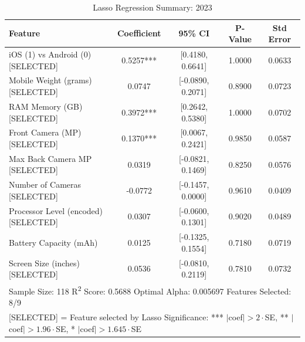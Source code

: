 \documentclass[12pt]{article}
\begin{document}
\begin{table}[ht]
\centering
\caption{Lasso Regression Summary: 2023}
\begin{tabular}{lcccc}
\toprule
Feature & Coefficient & 95\% CI & P-Value & Std Error \\
\midrule
iOS (1) vs Android (0) [SELECTED] & 0.5257*** & {[0.4180, 0.6641]} & 1.0000 & 0.0633 \\
Mobile Weight (grams) [SELECTED] & 0.0747 & {[-0.0890, 0.2071]} & 0.8900 & 0.0723 \\
RAM Memory (GB) [SELECTED] & 0.3972*** & {[0.2642, 0.5380]} & 1.0000 & 0.0702 \\
Front Camera (MP) [SELECTED] & 0.1370*** & {[0.0067, 0.2421]} & 0.9850 & 0.0587 \\
Max Back Camera MP [SELECTED] & 0.0319 & {[-0.0821, 0.1469]} & 0.8250 & 0.0576 \\
Number of Cameras [SELECTED] & -0.0772 & {[-0.1457, 0.0000]} & 0.9610 & 0.0409 \\
Processor Level (encoded) [SELECTED] & 0.0307 & {[-0.0600, 0.1301]} & 0.9020 & 0.0489 \\
Battery Capacity (mAh) & 0.0125 & {[-0.1325, 0.1554]} & 0.7180 & 0.0719 \\
Screen Size (inches) [SELECTED] & 0.0536 & {[-0.0810, 0.2119]} & 0.7810 & 0.0732 \\
\midrule
\multicolumn{5}{l}{\footnotesize Sample Size: 118 \quad R\textsuperscript{2} Score: 0.5688 \quad Optimal Alpha: 0.005697 \quad Features Selected: 8/9} \\
\multicolumn{5}{l}{\footnotesize [SELECTED] = Feature selected by Lasso \quad Significance: *** $|$coef$|>2\cdot$SE, ** $|$coef$|>1.96\cdot$SE, * $|$coef$|>1.645\cdot$SE} \\
\bottomrule
\end{tabular}
\end{table}
\end{document}
